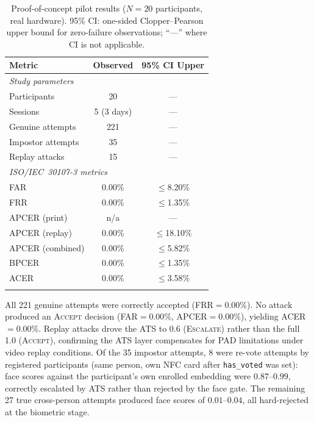 \documentclass[pdflatex,sn-mathphys-num]{sn-jnl}%
\theoremstyle{thmstyleone}%
\theoremstyle{thmstyletwo}%
\theoremstyle{thmstylethree}%
\begin{document}
\begin{table}[t]
\caption{Proof-of-concept pilot results (\(N{=}20\) participants, real
  hardware). 95\% CI: one-sided Clopper--Pearson upper bound for zero-failure
  observations; ``---'' where CI is not applicable.}
\label{tab:pilot}%
\begin{tabular}{@{}lcc@{}}
  \toprule
  Metric & Observed & 95\% CI Upper \\
  \midrule
  \multicolumn{3}{l}{\textit{Study parameters}} \\
  \quad Participants       & 20          & --- \\
  \quad Sessions           & 5 (3 days)  & --- \\
  \quad Genuine attempts   & 221         & --- \\
  \quad Impostor attempts  & 35          & --- \\
  \quad Replay attacks     & 15          & --- \\
  \midrule
  \multicolumn{3}{l}{\textit{ISO/IEC~30107-3 metrics}} \\
  \quad FAR                & 0.00\%  & \(\leq\)8.20\% \\
  \quad FRR                & 0.00\%  & \(\leq\)1.35\% \\
  \quad APCER (print)      & n/a     & --- \\
  \quad APCER (replay)     & 0.00\%  & \(\leq\)18.10\% \\
  \quad APCER (combined)   & 0.00\%  & \(\leq\)5.82\% \\
  \quad BPCER              & 0.00\%  & \(\leq\)1.35\% \\
  \quad ACER               & 0.00\%  & \(\leq\)3.58\% \\
  \botrule
\end{tabular}
\end{table}

All 221 genuine attempts were correctly accepted (FRR\(=0.00\%\)). No attack
produced an \textsc{Accept} decision (FAR\(=0.00\%\), APCER\(=0.00\%\)),
yielding ACER\(=0.00\%\). Replay attacks drove the ATS to 0.6
(\textsc{Escalate}) rather than the full 1.0 (\textsc{Accept}), confirming the
ATS layer compensates for PAD limitations under video replay conditions. Of the
35 impostor attempts, 8 were re-vote attempts by registered participants (same
person, own NFC card after \texttt{has\_voted} was set): face scores against
the participant's own enrolled embedding were \(0.87\)--\(0.99\), correctly
escalated by ATS rather than rejected by the face gate. The remaining 27 true
cross-person attempts produced face scores of \(0.01\)--\(0.04\), all
hard-rejected at the biometric stage.
\end{document}
